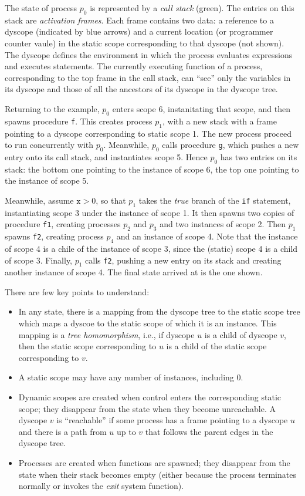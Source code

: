 The state of process $p_0$ is represented by a \emph{call stack}
(green).  The entries on this stack are \emph{activation frames}.
Each frame contains two data: a reference to a dyscope (indicated by
blue arrows) and a current location (or programmer counter vaule) in
the static scope corresponding to that dyscope (not shown).  The
dyscope defines the environment in which the process evaluates
expressions and executes statements.  The currently executing function
of a process, corresponding to the top frame in the call stack, can
``see'' only the variables in its dyscope and those of all the
ancestors of its dyscope in the dyscope tree.

Returning to the example, $p_0$ enters scope 6, instanitating that
scope, and then spawns procedure \texttt{f}.  This creates process
$p_1$, with a new stack with a frame pointing to a dyscope
corresponding to static scope 1.  The new process proceed to run
concurrently with $p_0$.  Meanwhile, $p_0$ calls procedure \texttt{g},
which pushes a new entry onto its call stack, and instantiates scope
5.  Hence $p_0$ has two entries on its stack: the bottom one pointing
to the instance of scope 6, the top one pointing to the instance of
scope 5.

Meanwhile, assume $\texttt{x}>0$, so that $p_1$ takes the \emph{true}
branch of the \texttt{if} statement, instantiating scope 3 under the
instance of scope 1.  It then spawns two copies of procedure
\texttt{f1}, creating processes $p_2$ and $p_3$ and two instances of
scope 2.  Then $p_1$ spawns \texttt{f2}, creating process $p_4$ and an
instance of scope 4.  Note that the instance of scope 4 is a chile of
the instance of scope 3, since the (static) scope 4 is a child of
scope 3.  Finally, $p_1$ calls \texttt{f2}, pushing a new entry on its
stack and creating another instance of scope 4.  The final state
arrived at is the one shown.

There are few key points to understand:
\begin{itemize}
\item In any state, there is a mapping from the dyscope tree to the
  static scope tree which maps a dyscoe to the static scope of which
  it is an instance.  This mapping is a \emph{tree homomorphism},
  i.e., if dyscope $u$ is a child of dyscope $v$, then the static
  scope corresponding to $u$ is a child of the static scope
  corresponding to $v$.
\item A static scope may have any number of instances, including 0.
\item Dynamic scopes are created when control enters the corresponding
  static scope; they disappear from the state when they become
  unreachable.  A dyscope $v$ is ``reachable'' if some process has a
  frame pointing to a dyscope $u$ and there is a path from $u$ up to
  $v$ that follows the parent edges in the dyscope tree.
\item Processes are created when functions are spawned; they disappear
  from the state when their stack becomes empty (either because the
  process terminates normally or invokes the \emph{exit} system
  function).
\end{itemize}

